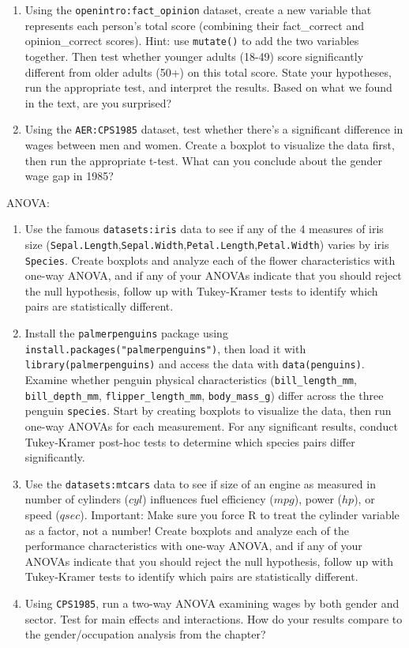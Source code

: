 \documentclass[
  letterpaper,
]{book}
\begin{document}
\begin{enumerate}
\def\labelenumi{\arabic{enumi}.}
\item
  Using the \texttt{openintro:fact\_opinion} dataset, create a new
  variable that represents each person's total score (combining their
  fact\_correct and opinion\_correct scores). Hint: use
  \texttt{mutate()} to add the two variables together. Then test whether
  younger adults (18-49) score significantly different from older adults
  (50+) on this total score. State your hypotheses, run the appropriate
  test, and interpret the results. Based on what we found in the text,
  are you surprised?
\item
  Using the \texttt{AER:CPS1985} dataset, test whether there's a
  significant difference in wages between men and women. Create a
  boxplot to visualize the data first, then run the appropriate t-test.
  What can you conclude about the gender wage gap in 1985?
\end{enumerate}

ANOVA:

\begin{enumerate}
\def\labelenumi{\arabic{enumi}.}
\setcounter{enumi}{2}
\item
  Use the famous \texttt{datasets:iris} data to see if any of the 4
  measures of iris size
  (\texttt{Sepal.Length},\texttt{Sepal.Width},\texttt{Petal.Length},\texttt{Petal.Width})
  varies by iris \texttt{Species}. Create boxplots and analyze each of
  the flower characteristics with one-way ANOVA, and if any of your
  ANOVAs indicate that you should reject the null hypothesis, follow up
  with Tukey-Kramer tests to identify which pairs are statistically
  different.
\item
  Install the \texttt{palmerpenguins} package using
  \texttt{install.packages("palmerpenguins")}, then load it with
  \texttt{library(palmerpenguins)} and access the data with
  \texttt{data(penguins)}. Examine whether penguin physical
  characteristics (\texttt{bill\_length\_mm}, \texttt{bill\_depth\_mm},
  \texttt{flipper\_length\_mm}, \texttt{body\_mass\_g}) differ across
  the three penguin \texttt{species}. Start by creating boxplots to
  visualize the data, then run one-way ANOVAs for each measurement. For
  any significant results, conduct Tukey-Kramer post-hoc tests to
  determine which species pairs differ significantly.
\item
  Use the \texttt{datasets:mtcars} data to see if size of an engine as
  measured in number of cylinders (\(cyl\)) influences fuel efficiency
  (\(mpg\)), power (\(hp\)), or speed (\(qsec\)). Important: Make sure
  you force R to treat the cylinder variable as a factor, not a number!
  Create boxplots and analyze each of the performance characteristics
  with one-way ANOVA, and if any of your ANOVAs indicate that you should
  reject the null hypothesis, follow up with Tukey-Kramer tests to
  identify which pairs are statistically different.
\item
  Using \texttt{CPS1985}, run a two-way ANOVA examining wages by both
  gender and sector. Test for main effects and interactions. How do your
  results compare to the gender/occupation analysis from the chapter?
\end{enumerate}
\end{document}
